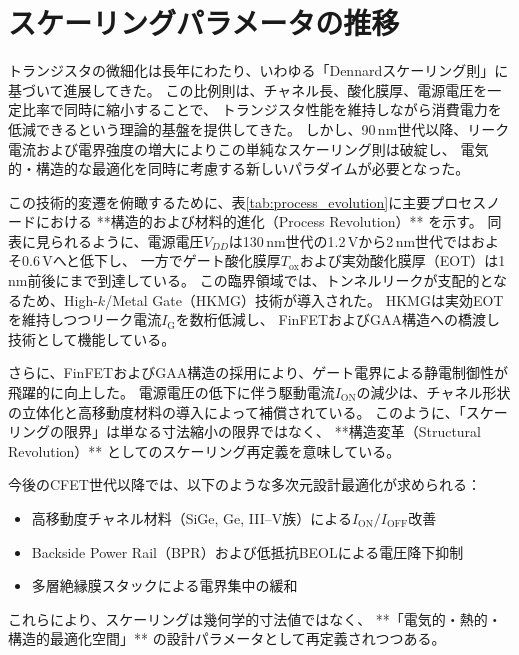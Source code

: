 \section{スケーリングパラメータの推移}
トランジスタの微細化は長年にわたり、いわゆる「Dennardスケーリング則」に基づいて進展してきた。  
この比例則は、チャネル長、酸化膜厚、電源電圧を一定比率で同時に縮小することで、  
トランジスタ性能を維持しながら消費電力を低減できるという理論的基盤を提供してきた。  
しかし、90\,nm世代以降、リーク電流および電界強度の増大によりこの単純なスケーリング則は破綻し、  
電気的・構造的な最適化を同時に考慮する新しいパラダイムが必要となった。

この技術的変遷を俯瞰するために、表\ref{tab:process_evolution}に主要プロセスノードにおける  
**構造的および材料的進化（Process Revolution）** を示す。  
同表に見られるように、電源電圧$V_{DD}$は130\,nm世代の1.2\,Vから2\,nm世代ではおよそ0.6\,Vへと低下し、  
一方でゲート酸化膜厚$T_\text{ox}$および実効酸化膜厚（EOT）は1\,nm前後にまで到達している。  
この臨界領域では、トンネルリークが支配的となるため、High-$k$/Metal Gate（HKMG）技術が導入された。  
HKMGは実効EOTを維持しつつリーク電流$I_\text{G}$を数桁低減し、  
FinFETおよびGAA構造への橋渡し技術として機能している。

さらに、FinFETおよびGAA構造の採用により、ゲート電界による静電制御性が飛躍的に向上した。  
電源電圧の低下に伴う駆動電流$I_\text{ON}$の減少は、チャネル形状の立体化と高移動度材料の導入によって補償されている。  
このように、「スケーリングの限界」は単なる寸法縮小の限界ではなく、  
**構造変革（Structural Revolution）** としてのスケーリング再定義を意味している。

今後のCFET世代以降では、以下のような多次元設計最適化が求められる：
\begin{itemize}
    \item 高移動度チャネル材料（SiGe, Ge, III–V族）による$I_\text{ON}/I_\text{OFF}$改善  
    \item Backside Power Rail（BPR）および低抵抗BEOLによる電圧降下抑制  
    \item 多層絶縁膜スタックによる電界集中の緩和  
\end{itemize}
これらにより、スケーリングは幾何学的寸法値ではなく、  
**「電気的・熱的・構造的最適化空間」** の設計パラメータとして再定義されつつある。


